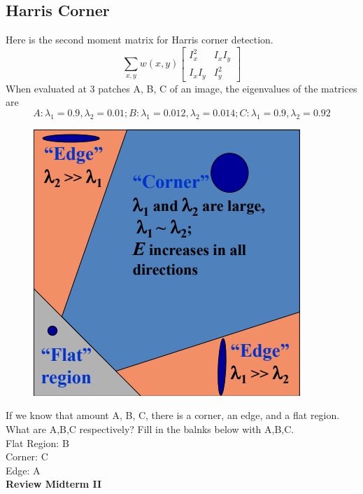 \documentclass[12pt,letterpaper]{article}
\begin{document}
\subsection{Harris Corner}
Here is the second moment matrix for Harris corner detection. 
$$\sum_{x,y} w(x,y)\begin{bmatrix}I_{x}^{2} & I_xI_y\\ I_xI_y & I_{y}^2\end{bmatrix}$$
When evaluated at 3 patches A, B, C of an image, the eigenvalues of the matrices are 
$$A: \lambda_1 = 0.9, \lambda_2 = 0.01; B: \lambda_1 = 0.012, \lambda_2 = 0.014; C: \lambda_1 = 0.9, \lambda_2 = 0.92$$
\begin{center}
\begin{figure}[h!]
    \centering
    \includegraphics[scale=0.5]{images/ecf.png}
\end{figure}
\end{center}
If we know that amount A, B, C, there is a corner, an edge, and a flat region. What are A,B,C respectively? Fill in the balnks below with A,B,C. \\
Flat Region: \color{red} B \color{black}\\
Corner: \color{red} C \color{black} \\
Edge: \color{red} A \color{black}
\\
\textbf{Review Midterm II}
\end{document}
